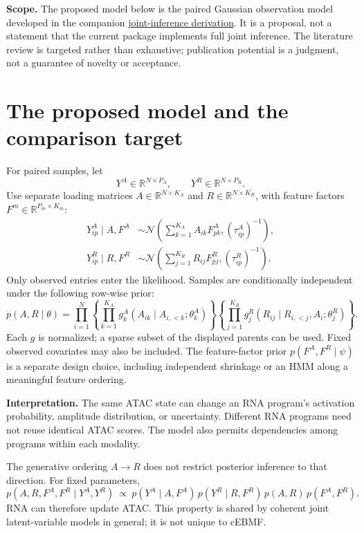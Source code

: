 \documentclass[11pt,a4paper]{article}
\newcommand{\R}{\mathbb R}
\newcommand{\N}{\mathcal N}
\numberwithin{equation}{section}
\begin{document}
\textbf{Scope.} The proposed model below is the paired Gaussian observation
model developed in the companion
\href{run:atac_rna_joint_inference.pdf}{joint-inference derivation}.
It is a proposal, not a statement that the current package implements full
joint inference. The literature review is targeted rather than exhaustive;
publication potential is a judgment, not a guarantee of novelty or acceptance.

\clearpage
\section{The proposed model and the comparison target}

For paired samples, let
\[
Y^A\in\R^{N\times P_A},\qquad Y^R\in\R^{N\times P_R}.
\]
Use separate loading matrices \(A\in\R^{N\times K_A}\) and
\(R\in\R^{N\times K_R}\), with feature factors
\(F^m\in\R^{P_m\times K_m}\):
\begin{align}
Y^A_{ip}\mid A,F^A&\sim
 \N\!\left(\sum_{k=1}^{K_A}A_{ik}F^A_{pk},(\tau^A_{ip})^{-1}\right),\\
Y^R_{ip}\mid R,F^R&\sim
 \N\!\left(\sum_{j=1}^{K_R}R_{ij}F^R_{pj},(\tau^R_{ip})^{-1}\right).
\end{align}
Only observed entries enter the likelihood. Samples are conditionally
independent under the following row-wise prior:
\begin{equation}\label{eq:dag}
p(A,R\mid\theta)=
\prod_{i=1}^{N}
\left\{\prod_{k=1}^{K_A}
g^A_k(A_{ik}\mid A_{i,<k};\theta^A_k)\right\}
\left\{\prod_{j=1}^{K_R}
g^R_j(R_{ij}\mid R_{i,<j},A_i;\theta^R_j)\right\}.
\end{equation}
Each \(g\) is normalized; a sparse subset of the displayed parents can be
used. Fixed observed covariates may also be included. The feature-factor
prior \(p(F^A,F^R\mid\psi)\) is a separate design choice, including independent
shrinkage or an HMM along a meaningful feature ordering.

\textbf{Interpretation.} The same ATAC state can change an RNA program's
activation probability, amplitude distribution, or uncertainty. Different
RNA programs need not reuse identical ATAC scores. The model also permits
dependencies among programs within each modality.

The generative ordering \(A\to R\) does not restrict posterior inference to
that direction. For fixed parameters,
\[
p(A,R,F^A,F^R\mid Y^A,Y^R)
\ \propto\ p(Y^A\mid A,F^A)\,p(Y^R\mid R,F^R)\,
p(A,R)\,p(F^A,F^R).
\]
RNA can therefore update ATAC. This property is shared by coherent joint
latent-variable models in general; it is not unique to cEBMF.
\end{document}
